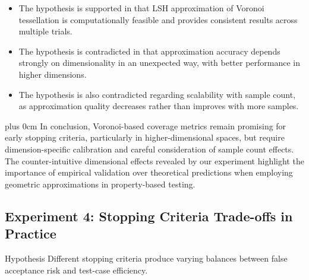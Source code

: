 \documentclass[conference]{IEEEtran}
\newcommand{\justifytext}{\leftskip=0pt \rightskip=0pt plus 0cm}
\begin{document}
\begin{itemize}
    \item The hypothesis is supported in that LSH approximation of Voronoi tessellation is computationally feasible and provides consistent results across multiple trials.
    
    \item The hypothesis is contradicted in that approximation accuracy depends strongly on dimensionality in an unexpected way, with better performance in higher dimensions.
    
    \item The hypothesis is also contradicted regarding scalability with sample count, as approximation quality decreases rather than improves with more samples.
\end{itemize}

\justifytext
In conclusion, Voronoi-based coverage metrics remain promising for early stopping criteria, particularly in higher-dimensional spaces, but require dimension-specific calibration and careful consideration of sample count effects. The counter-intuitive dimensional effects revealed by our experiment highlight the importance of empirical validation over theoretical predictions when employing geometric approximations in property-based testing.

\subsection{Experiment 4: Stopping Criteria Trade-offs in Practice}

\begin{theorembox}{Hypothesis}
Different stopping criteria produce varying balances between false acceptance risk and test-case efficiency.
\end{theorembox}
\end{document}
